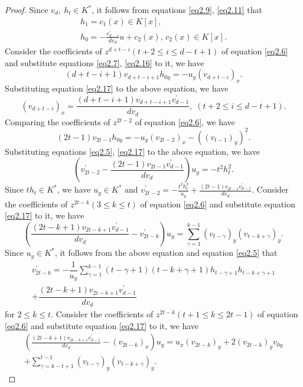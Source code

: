\documentclass[12pt, twoside, leqno]{article}
\theoremstyle{definition}
\numberwithin{equation}{section}
\begin{document}
\begin{proof}
Since $v_d,~h_t\in K^*$, it follows from equations \eqref{eq2.9}, \eqref{eq2.11} that
\begin{eqnarray}
h_{1}=c_{1}(x) \in K[x],\label{eq2.16}\\
h_{0}= -\frac{v_{d-1}^{'}}{dv_{d}} u+c_{2}(x),\,c_{2}(x)\in K[x].\label{eq2.17}
\end{eqnarray}
Consider the coefficients of $z^{d+t-i}$$(t+2\leq i\leq d-t+1)$ of equation \eqref{eq2.6} and substitute equations \eqref{eq2.7}, \eqref{eq2.16} to it, we have
$$(d+t-i+1)v_{d+t-i+1}h_{0y}=-u_{y}(v_{d+t-i})_x.$$
Substituting equation \eqref{eq2.17} to the above equation, we have
\begin{equation}\label{eq2.18}
(v_{d+t-i})_x=\dfrac{(d+t-i+1)v_{d+t-i+1}v_{d-1}^{'}}{dv_{d}},\;(t+2\leq i\leq d-t+1).
\end{equation}
Comparing the coefficients of $z^{2t-2}$ of equation \eqref{eq2.6}, we have
$$(2t-1)v_{2t-1}h_{0y}=-u_y(v_{2t-2})_x-((v_{t-1})_y)^2.$$
Substituting equations \eqref{eq2.5}, \eqref{eq2.17} to the above equation, we have
$$\left( v_{2t-2}^{'}-\frac{(2t-1)v_{2t-1}v_{d-1}^{'}}{dv_{d}}\right)u_{y}=-t^{2}h_{t}^{2}.$$
Since $th_t\in K^*$, we have $u_y\in K^*$ and $v_{2t-2}^{'}=-\frac{t^{2}h_{t}^{2}}{u_{y}}+ \frac{\left( 2t-1\right) v_{2t-1}v_{d-1}^{'}}{dv_{d}}$. Consider the coefficients of $z^{2t-k}$$(3\leq k\leq t)$ of equation \eqref{eq2.6} and substitute equation \eqref{eq2.17} to it, we have
$$\left( \frac{\left( 2t-k+1\right) v_{2t-k+1}v_{d-1}^{'}}{dv_{d}}-v_{2t-k}^{'}\right) u_{y}=\sum_{\gamma=1}^{k-1}(v_{t-\gamma})_y(v_{t-k+\gamma})_y.$$
Since $u_y\in K^*$, it follows from the above equation and equation \eqref{eq2.5} that
\begin{equation}\label{eq2.19}
\begin{split}
v_{2t-k}^{'}=-\dfrac{1}{u_{y}}\sum_{\gamma=1}^{k-1}(t-\gamma+1)(t-k+\gamma+1)h_{t-\gamma+1}h_{t-k+\gamma+1}\\+\dfrac{(2t-k+1)v_{2t-k+1}v_{d-1}^{'}}{dv_{d}}
\end{split}
\end{equation}
for $2\leq k\leq t$. Consider the coefficients of $z^{2t-k}$$(t+1\leq k\leq 2t-1)$ of equation \eqref{eq2.6} and substitute equation \eqref{eq2.17} to it, we have
\begin{equation}\nonumber
\begin{split}
\left(\frac{(2t-k+1) v_{2t-k+1}v_{d-1}^{'}}{dv_{d}}-(v_{2t-k})_x\right) u_{y}=u_{x}(v_{2t-k})_y+2(v_{2t-k})_yv_{0y}\\+\sum_{\gamma=k-t+1}^{t-1}(v_{t-\gamma})_y(v_{t-k+\gamma})_y.

\end{split}
\end{equation}$$
\end{proof}
\end{document}
